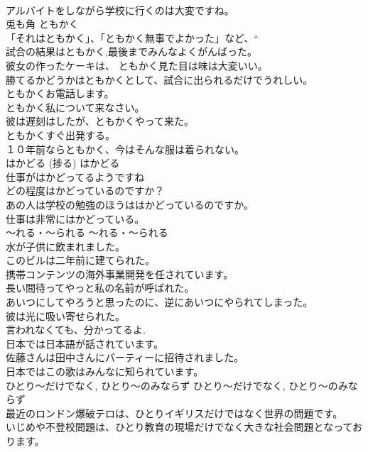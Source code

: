 \documentclass[8pt]{extreport}
\begin{document}
\begin{CJK}{UTF8}{min}
\\	アルバイトをしながら学校に行くのは大変ですね。  
\\	兎も角	ともかく	
\\	「それはともかく」、「ともかく無事でよかった」など、“	
\\	試合の結果はともかく,最後までみんなよくがんばった。  
\\	彼女の作ったケーキは、 ともかく見た目は味は大変いい。  
\\	勝てるかどうかはともかくとして、試合に出られるだけでうれしい。  
\\	ともかくお電話します。   
\\	ともかく私について来なさい。   
\\	彼は遅刻はしたが、ともかくやって来た。   
\\	ともかくすぐ出発する。   
\\	１０年前ならともかく、今はそんな服は着られない。  
\\	はかどる (捗る)	はかどる	
\\	仕事がはかどってるようですね  
\\	どの程度はかどっているのですか？  
\\	あの人は学校の勉強のほうははかどっているのですか。  
\\	仕事は非常にはかどっている。  
\\	〜れる・〜られる	〜れる・〜られる	
\\	水が子供に飲まれました。  
\\	このビルは二年前に建てられた。  
\\	携帯コンテンツの海外事業開発を任されています。   
\\	長い間待ってやっと私の名前が呼ばれた。  
\\	あいつにしてやろうと思ったのに、逆にあいつにやられてしまった。  
\\	彼は光に吸い寄せられた。  
\\	言われなくても、分かってるよ.   
\\	日本では日本語が話されています。   
\\	佐藤さんは田中さんにパーティーに招待されました。   
\\	日本ではこの歌はみんなに知られています。  
\\	ひとり〜だけでなく, ひとり〜のみならず	ひとり〜だけでなく, ひとり〜のみならず	
\\	最近のロンドン爆破テロは、ひとりイギリスだけではなく世界の問題です。  
\\	いじめや不登校問題は、ひとり教育の現場だけでなく大きな社会問題となっております。  

\end{CJK}
\end{document}
